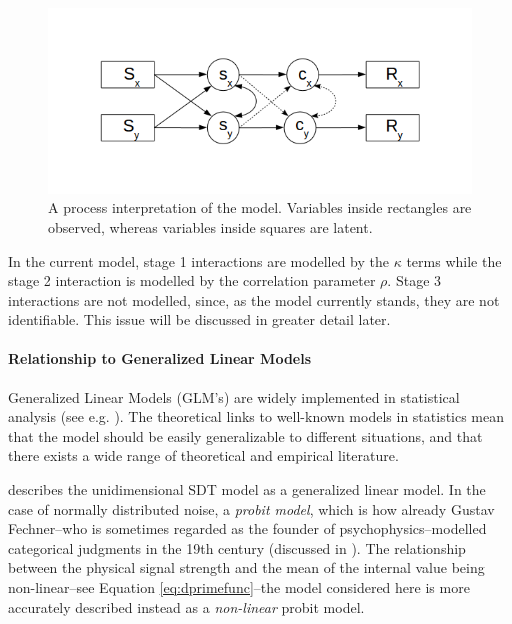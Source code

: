 \documentclass{article}\usepackage{knitr}
\begin{document}
\begin{figure}[!htb]
\centering
\includegraphics[scale = 0.8]{Process_model}
\caption{A process interpretation of the model. Variables inside rectangles are observed, whereas variables inside squares are latent. }
\label{fig:GRTprocess}
\end{figure}

In the current model, stage 1 interactions are modelled by the $\kappa$ terms while the stage 2 interaction is modelled by the correlation parameter $\rho$. Stage 3 interactions are not modelled, since, as the model currently stands, they are not identifiable. This issue will be discussed in greater detail later. 

\paragraph{Relationship to Generalized Linear Models}

Generalized Linear Models (GLM's) are widely implemented in statistical analysis (see e.g. \citet{kruschke2015, skrondahl2004}). The theoretical links to well-known models in statistics mean that the model should be easily generalizable to different situations, and that there exists a wide range of theoretical and empirical literature. 
 
\cite{decarlo1998} describes the unidimensional SDT model as a generalized linear model. In the case of normally distributed noise, a \textit{probit model}, which is how already Gustav Fechner--who is sometimes regarded as the founder of psychophysics--modelled categorical judgments in the 19th century (discussed in \citealt[Chapter 7]{stigler2003}). The relationship between the physical signal strength and the mean of the internal value being non-linear--see Equation \ref{eq:dprimefunc}--the model considered here is more accurately described instead as a \textit{non-linear} \citep[p. 379]{box2005} probit model. 
\end{document}
